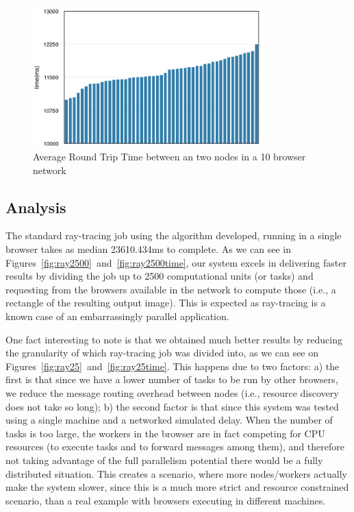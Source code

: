 \begin{figure}[h!]
  \centering
  \includegraphics[width=0.8\textwidth]{figs/rtt.png}
  \caption{Average Round Trip Time between an two nodes in a 10 browser network}
  \label{fig:rtt}
\end{figure}

\subsection{Analysis}

The standard ray-tracing job using the algorithm developed, running in a single browser takes as median 23610.434ms to complete. As we can see in Figures~\ref{fig:ray2500}~and~\ref{fig:ray2500time}, our system excels in delivering faster results by dividing the job up to 2500 computational units (or tasks) and requesting from the browsers available in the network to compute those (i.e., a rectangle of the resulting output image). This is expected as ray-tracing is a known case of an embarrassingly parallel application.

One fact interesting to note is that we obtained much better results by reducing the granularity of which ray-tracing job was divided into, as we can see on Figures~\ref{fig:ray25}~and~\ref{fig:ray25time}. This happens due to two factors: a) the first is that since we have a lower number of tasks to be run by other browsers, we reduce the message routing overhead between nodes (i.e., resource discovery does not take so long); b) the second factor is that since this system was tested using a single machine and a networked simulated delay. When the number of tasks is too large, the workers in the browser are in fact competing for CPU resources (to execute tasks and to forward messages among them), and therefore not taking advantage of the full parallelism potential there would be a fully distributed situation. This creates a scenario, where more nodes/workers actually  make the system slower, since this is a much more strict and resource constrained scenario, than a real example with browsers executing in different machines.

